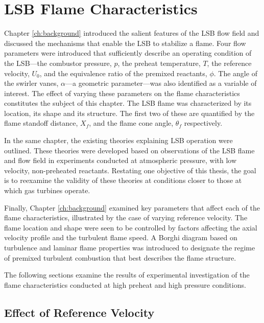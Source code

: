 \chapter{LSB Flame Characteristics}
\label{ch:lsb}

Chapter \ref{ch:background} introduced the salient features of the LSB flow field and discussed the mechanisms that enable the LSB to stabilize a flame.
Four flow parameters were introduced that sufficiently describe an operating condition of the LSB---the combustor pressure, \(p\), the preheat temperature, \(T\), the reference velocity, \(U_0\), and the equivalence ratio of the premixed reactants, \(\phi\).
The angle of the swirler vanes, \(\alpha\)---a geometric parameter---was also identified as a variable of interest.
The effect of varying these parameters on the flame characteristics constitutes the subject of this chapter.
The LSB flame was characterized by its location, its shape and its structure.
The first two of these are quantified by the flame standoff distance, \(X_f\), and the flame cone angle, \(\theta_f\) respectively.

In the same chapter, the existing theories explaining LSB operation were outlined.
These theories were developed based on observations of the LSB flame and flow field in experiments conducted at atmospheric pressure, with low velocity, non-preheated reactants.
Restating one objective of this thesis, the goal is to reexamine the validity of these theories at conditions closer to those at which gas turbines operate.

Finally, Chapter \ref{ch:background} examined key parameters that affect each of the flame characteristics, illustrated by the case of varying reference velocity.
The flame location and shape were seen to be controlled by factors affecting the axial velocity profile and the turbulent flame speed.
A Borghi diagram based on turbulence and laminar flame properties was introduced to designate the regime of premixed turbulent combustion that best describes the flame structure.

The following sections examine the results of experimental investigation of the flame characteristics conducted at high preheat and high pressure conditions.

\section{Effect of Reference Velocity}
\label{sec:lsb-effect-of-reference-velocity}


